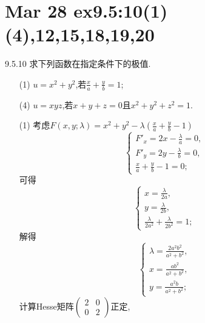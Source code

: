 \section{Mar 28 ex9.5:10(1)(4),12,15,18,19,20}

\begin{exercise}{9.5.10}
    求下列函数在指定条件下的极值.
    \begin{enumerate}
        \item[(1)] $u=x^2+y^2$,若$\frac{x}{a}+\frac{y}{b}=1$;
        \item[(4)] $u=xyz$,若$x+y+z=0$且$x^2+y^2+z^2=1$.
    \end{enumerate}
\end{exercise}
\begin{solution}
    \begin{enumerate}
        \item [(1)] 考虑$F(x,y;\lambda)=x^2+y^2-\lambda\left(\frac{x}{a}+\frac{y}{b}-1\right)$
        $$\begin{cases}
            F'_x=2x-\frac{\lambda}{a}=0,\\
            F'_y=2y-\frac{\lambda}{b}=0,\\
            \frac{x}{a}+\frac{y}{b}-1=0;
        \end{cases}$$
        可得$$\begin{cases}
            x=\frac{\lambda}{2a},\\
            y=\frac{\lambda}{2b},\\
            \frac{\lambda}{2a^2}+\frac{\lambda}{2b^2}=1;
        \end{cases}$$
        解得$$\begin{cases}
            \lambda=\frac{2a^2b^2}{a^2+b^2},\\
            x=\frac{ab^2}{a^2+b^2},\\
            y=\frac{a^2b}{a^2+b^2};
        \end{cases}$$
        计算Hesse矩阵$\begin{pmatrix}
            2&0\\
            0&2
        \end{pmatrix}$正定,
        

\end{enumerate}
\end{solution}
